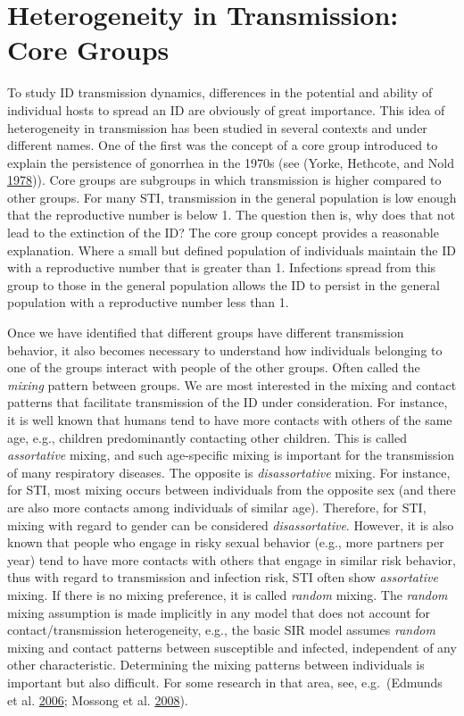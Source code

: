 \documentclass[
]{book}
\begin{document}
\hypertarget{heterogeneity-in-transmission-core-groups}{%
\section{Heterogeneity in Transmission: Core Groups}\label{heterogeneity-in-transmission-core-groups}}

To study ID transmission dynamics, differences in the potential and ability of individual hosts to spread an ID are obviously of great importance. This idea of heterogeneity in transmission has been studied in several contexts and under different names. One of the first was the concept of a core group introduced to explain the persistence of gonorrhea in
the 1970s (see (Yorke, Hethcote, and Nold \protect\hyperlink{ref-yorke78}{1978})). Core groups are subgroups in which transmission is higher compared to other groups. For many STI, transmission in the general population is low enough that the reproductive number is below 1. The question then is, why does that not lead to the extinction of the ID? The core group concept provides a reasonable explanation. Where a small but defined population of individuals maintain the ID with a reproductive number that is greater than 1. Infections spread from this group to those in the general population allows the ID to persist in the general population with a reproductive number less than 1.

Once we have identified that different groups have different transmission behavior, it also becomes necessary to understand how individuals belonging to one of the groups interact with people of the other groups. Often called the \emph{mixing} pattern between groups. We are most interested in the mixing and contact patterns that facilitate transmission of the ID under consideration. For instance, it is well known that humans tend to have more contacts with others of the same age, e.g., children predominantly contacting other children. This is called \emph{assortative} mixing, and such age-specific mixing is important for the transmission of many respiratory diseases. The opposite is \emph{disassortative} mixing. For instance, for STI, most mixing occurs between individuals from the opposite sex (and there are also more contacts among individuals of similar age). Therefore, for STI, mixing with regard to gender can be considered \emph{disassortative}. However, it is also known that people who engage in risky sexual behavior (e.g., more partners per year) tend to have more contacts with others that engage in similar risk behavior, thus with regard to transmission and infection risk, STI often show \emph{assortative} mixing. If there is no mixing preference, it is called \emph{random} mixing. The \emph{random} mixing assumption is made implicitly in any model that does not account for contact/transmission heterogeneity, e.g., the basic SIR model assumes \emph{random} mixing and contact patterns between susceptible and infected, independent of any other characteristic. Determining the mixing patterns between individuals is important but also difficult. For some research in that area, see, e.g.~(Edmunds et al. \protect\hyperlink{ref-edmunds06}{2006}; Mossong et al. \protect\hyperlink{ref-mossong08}{2008}).
\end{document}
